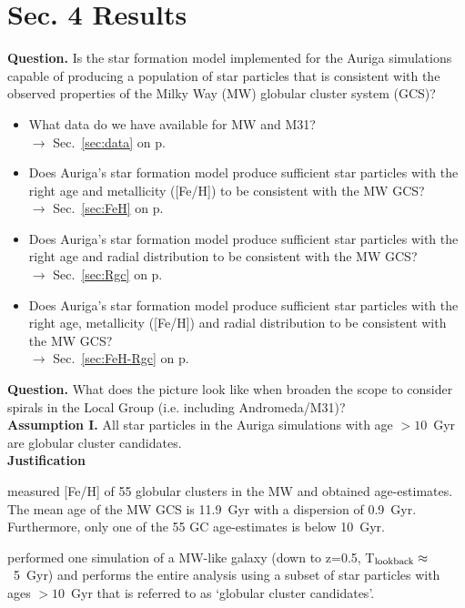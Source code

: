 \documentclass[12pt, a4paper]{article}
\begin{document}
\part*{Sec. 4 \quad Results}
\textbf{Question.} Is the star formation model implemented for the Auriga simulations 
capable of producing a population of star particles that is consistent with the
observed properties of the Milky Way (MW) globular cluster system (GCS)? 
\begin{itemize}
    \item What data do we have available for MW and M31? \\ 
        \null\qquad $\rightarrow$ Sec.~\ref{sec:data} on p.~\pageref{sec:data}
    \item Does Auriga's star formation model produce sufficient star particles 
        with the right age and metallicity ([Fe/H]) to be consistent with the
        MW GCS? \\ 
        \null\qquad $\rightarrow$ Sec.~\ref{sec:FeH} on p.~\pageref{sec:FeH}
    \item Does Auriga's star formation model produce sufficient star particles
        with the right age and radial distribution to be consistent with the
        MW GCS? \\ 
        \null\qquad $\rightarrow$ Sec.~\ref{sec:Rgc} on p.~\pageref{sec:Rgc}
    \item Does Auriga's star formation model produce sufficient star particles
        with the right age, metallicity ([Fe/H]) and radial distribution to be
        consistent with the MW GCS? \\ 
        \null\qquad $\rightarrow$ Sec.~\ref{sec:FeH-Rgc} on p.~\pageref{sec:FeH-Rgc}
\end{itemize}
\textbf{Question.} What does the picture look like when broaden the scope to 
consider spirals in the Local Group (i.e. including Andromeda/M31)? \\

\noindent \textbf{Assumption I.} All star particles in the Auriga simulations with age
$> 10$~Gyr are globular cluster candidates. \\

\textbf{Justification} 
\begin{enumerate}[i)]
    {\setlength\itemindent{25pt} \item 
        \citet{2013ApJ...775..134V} measured [Fe/H] of 55 globular clusters in
        the MW and obtained age-estimates. The mean age of the MW GCS is 11.9~Gyr 
        with a dispersion of 0.9~Gyr. Furthermore, only one of the 55 GC 
        age-estimates is below 10~Gyr.
    }
    {\setlength\itemindent{25pt} \item 
        \citet{2017MNRAS.465.3622R} performed one simulation of a MW-like galaxy 
        (down to z=0.5, T$_{\rm lookback}\approx$~5~Gyr) and performs the entire
        analysis using a subset of star particles with ages $>10$~Gyr that is 
        referred to as `globular cluster candidates'.
    }
\end{enumerate}
\end{document}
